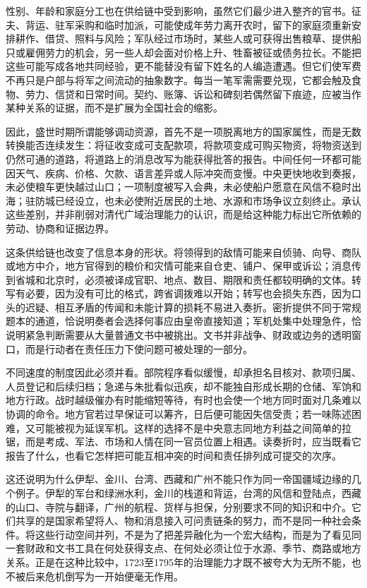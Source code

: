 性别、年龄和家庭分工也在供给链中受到影响，虽然它们最少进入整齐的官书。征夫、背运、驻军采购和临时加派，可能使成年劳力离开农时，留下的家庭须重新安排耕作、借贷、照料与风险；军队经过市场时，某些人或可获得出售粮草、提供船只或雇佣劳力的机会，另一些人却会面对价格上升、牲畜被征或债务拉长。不能把这些可能写成各地共同经验，更不能替没有留下姓名的人编造遭遇。但它们使军费不再只是户部与将军之间流动的抽象数字。每当一笔军需需要兑现，它都会触及食物、劳力、信贷和日常时间。契约、账簿、诉讼和碑刻若偶然留下痕迹，应被当作某种关系的证据，而不是扩展为全国社会的缩影。

因此，盛世时期所谓能够调动资源，首先不是一项脱离地方的国家属性，而是无数转换能否连续发生：将征收变成可支配款项，将款项变成可购买物资，将物资送到仍然可通的道路，将道路上的消息改写为能获得批答的报告。中间任何一环都可能因天气、疾病、价格、欠款、语言差异或人际冲突而变慢。中央更快地收到奏报，未必使粮车更快越过山口；一项制度被写入会典，未必使船户愿意在风信不稳时出海；驻防城已经设立，也未必使附近居民的土地、水源和市场争议立刻终止。承认这些差别，并非削弱对清代广域治理能力的认识，而是给这种能力标出它所依赖的劳动、协商和证据边界。

这条供给链也改变了信息本身的形状。将领得到的敌情可能来自侦骑、向导、商队或地方中介，地方官得到的粮价和灾情可能来自仓吏、铺户、保甲或诉讼；消息传到省城和北京时，必须被译成官职、地点、数目、期限和责任都较明确的文体。转写有必要，因为没有可比的格式，跨省调拨难以开始；转写也会损失东西，因为口头的迟疑、相互矛盾的传闻和未能计算的损耗不易进入奏折。密折提供不同于常规题本的通道，恰说明奏者会选择何事应由皇帝直接知道；军机处集中处理急件，恰说明紧急判断需要从大量普通文书中被挑出。文书并非战争、财政或边务的透明窗口，而是行动者在责任压力下使问题可被处理的一部分。

不同速度的制度因此必须并看。部院程序看似缓慢，却承担名目核对、款项归属、人员登记和后续归档；急递与朱批看似迅疾，却不能独自形成长期的仓储、军饷和地方行政。战时越级催办有时能缩短等待，有时也会使一个地方同时面对几条难以协调的命令。地方官若过早保证可以筹齐，日后便可能因失信受责；若一味陈述困难，又可能被视为延误军机。这样的选择不是中央意志同地方利益之间简单的拉锯，而是考成、军法、市场和人情在同一官员位置上相遇。读奏折时，应当既看它报告了什么，也看它怎样把可能互相冲突的时间和责任排列成可提交的次序。

这还说明为什么伊犁、金川、台湾、西藏和广州不能只作为同一帝国疆域边缘的几个例子。伊犁的军台和绿洲水利，金川的栈道和背运，台湾的风信和登陆点，西藏的山口、寺院与翻译，广州的航程、货样与担保，分别要求不同的知识和中介。它们共享的是国家希望将人、物和消息接入可问责链条的努力，而不是同一种社会条件。将这些行动空间并列，不是为了把差异融化为一个宏大结构，而是为了看见同一套财政和文书工具在何处获得支点、在何处必须让位于水源、季节、商路或地方关系。正是在这种比较中，1723至1795年的治理能力才既不被夸大为无所不能，也不被后来危机倒写为一开始便毫无作用。

